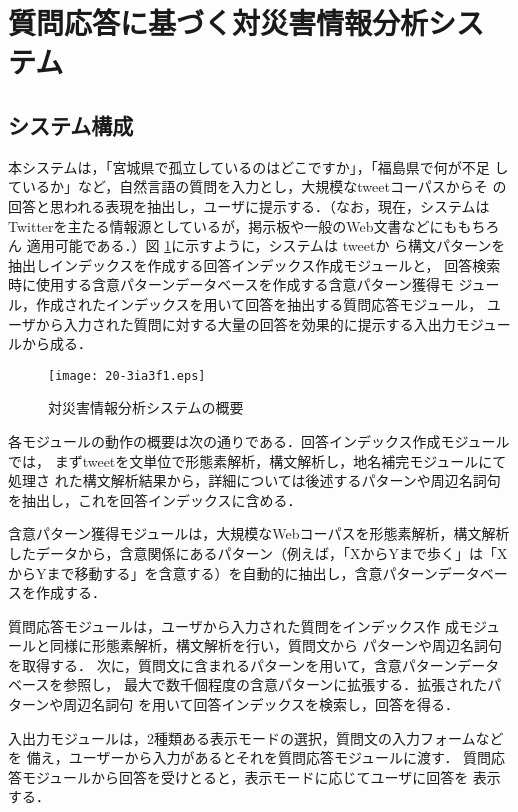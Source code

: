 \documentclass[japanese]{jnlp_1.4}
\begin{document}
\section{質問応答に基づく対災害情報分析システム}
\label{Disaster}


\subsection{システム構成}

本システムは，「宮城県で孤立しているのはどこですか」，「福島県で何が不足
しているか」など，自然言語の質問を入力とし，大規模なtweetコーパスからそ
の回答と思われる表現を抽出し，ユーザに提示する．（なお，現在，システムは
Twitterを主たる情報源としているが，掲示板や一般のWeb文書などにももちろん
適用可能である．）図 \ref{overview_fig}に示すように，システムは tweetか
ら構文パターンを抽出しインデックスを作成する回答インデックス作成モジュールと，
回答検索時に使用する含意パターンデータベースを作成する含意パターン獲得モ
ジュール，作成されたインデックスを用いて回答を抽出する質問応答モジュール，
ユーザから入力された質問に対する大量の回答を効果的に提示する入出力モジュー
ルから成る．

\begin{figure}[b]
\begin{center}
\texttt{[image: 20-3ia3f1.eps]}
\end{center}
\caption{対災害情報分析システムの概要}
\label{overview_fig}
\end{figure}

各モジュールの動作の概要は次の通りである．回答インデックス作成モジュールでは，
まずtweetを文単位で形態素解析，構文解析し，地名補完モジュールにて処理さ
れた構文解析結果から，詳細については後述するパターンや周辺名詞句を抽出し，これを回答インデックスに含める．

含意パターン獲得モジュールは，大規模なWebコーパスを形態素解析，構文解析
したデータから，含意関係にあるパターン（例えば，「XからYまで歩く」は「X
からYまで移動する」を含意する）を自動的に抽出し，含意パターンデータベー
スを作成する．

質問応答モジュールは，ユーザから入力された質問をインデックス作
成モジュールと同様に形態素解析，構文解析を行い，質問文から
パターンや周辺名詞句を取得する．
次に，質問文に含まれるパターンを用いて，含意パターンデータベースを参照し，
最大で数千個程度の含意パターンに拡張する．拡張されたパターンや周辺名詞句
を用いて回答インデックスを検索し，回答を得る．

入出力モジュールは，2種類ある表示モードの選択，質問文の入力フォームなどを
備え，ユーザーから入力があるとそれを質問応答モジュールに渡す．
質問応答モジュールから回答を受けとると，表示モードに応じてユーザに回答を
表示する．
\end{document}
